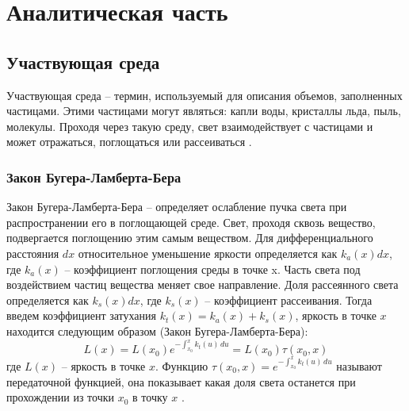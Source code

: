 \chapter{Аналитическая часть}

\section{Участвующая среда}
\label{math}
Участвующая среда -- термин, используемый для описания объемов, заполненных частицами. Этими частицами могут являться: капли воды, кристаллы льда, пыль, молекулы. Проходя через такую среду, свет взаимодействует с частицами и может отражаться, поглощаться или рассеиваться \cite{frostbite}.  

\subsection{Закон Бугера-Ламберта-Бера}
Закон Бугера-Ламберта-Бера -- определяет ослабление пучка света при распространении его в поглощающей среде. 
Свет, проходя сквозь вещество, подвергается поглощению этим самым веществом. Для дифференциального расстояния $ dx $ относительное уменьшение яркости определяется как $ k_a(x)dx $, где $ k_a(x) $ -- коэффициент поглощения среды в точке x. Часть света под воздействием частиц вещества меняет свое направление. Доля рассеянного света определяется как $ k_s(x)dx $, где $ k_s(x) $ -- коэффициент рассеивания. Тогда введем коэффициент затухания $ k_t(x)  = k_a(x) + k_s(x) $, яркость в точке $x$ находится следующим образом (Закон Бугера-Ламберта-Бера):  
\begin{equation}
	\label{beers_law}
	L(x) = L(x_0) e^{-\int_{x_0}^{x} k_t(u)\,du}=L(x_0)\tau(x_0, x) 
\end{equation}
где $ L(x) $ -- яркость в точке $ x $. Функцию $ \tau(x_0, x) = e^{-\int_{x_0}^{x} k_t(u)\,du}  $ называют передаточной функцией, она показывает какая доля света останется при прохождении из точки $ x_0 $ в точку $ x $ \cite{partmedia}.

